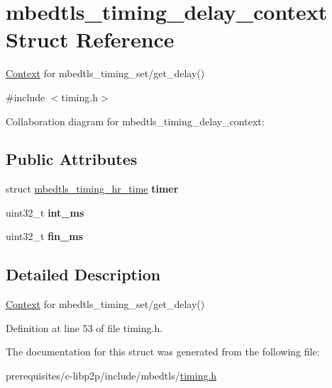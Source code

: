 \hypertarget{structmbedtls__timing__delay__context}{}\section{mbedtls\+\_\+timing\+\_\+delay\+\_\+context Struct Reference}
\label{structmbedtls__timing__delay__context}


\mbox{\hyperlink{struct_context}{Context}} for mbedtls\+\_\+timing\+\_\+set/get\+\_\+delay()  




{\ttfamily \#include $<$timing.\+h$>$}



Collaboration diagram for mbedtls\+\_\+timing\+\_\+delay\+\_\+context\+:
\subsection*{Public Attributes}
\begin{DoxyCompactItemize}
\item 
\mbox{\label{structmbedtls__timing__delay__context_abf629e677a656c08a5aa3e5ba0cbf2d5}} 
struct \mbox{\hyperlink{structmbedtls__timing__hr__time}{mbedtls\+\_\+timing\+\_\+hr\+\_\+time}} {\bfseries timer}
\item 
\mbox{\label{structmbedtls__timing__delay__context_a9887c5bc1eb16059afbc163052ca1cb8}} 
uint32\+\_\+t {\bfseries int\+\_\+ms}
\item 
\mbox{\label{structmbedtls__timing__delay__context_af31d3fb6212e38581dbe3b97afc45f55}} 
uint32\+\_\+t {\bfseries fin\+\_\+ms}
\end{DoxyCompactItemize}


\subsection{Detailed Description}
\mbox{\hyperlink{struct_context}{Context}} for mbedtls\+\_\+timing\+\_\+set/get\+\_\+delay() 

Definition at line 53 of file timing.\+h.



The documentation for this struct was generated from the following file\+:\begin{DoxyCompactItemize}
\item 
prerequisites/c-\/libp2p/include/mbedtls/\mbox{\hyperlink{timing_8h}{timing.\+h}}\end{DoxyCompactItemize}
